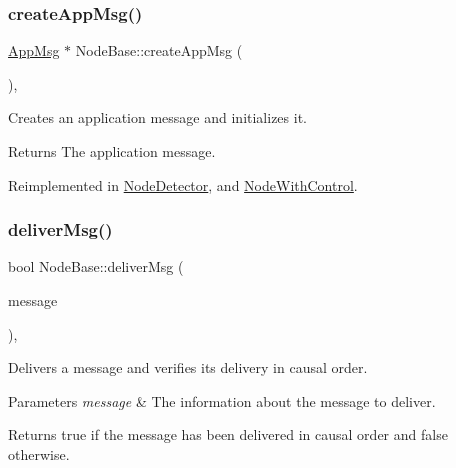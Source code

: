 \subsubsection{\texorpdfstring{create\+App\+Msg()}{createAppMsg()}}
{\footnotesize\ttfamily \hyperlink{class_app_msg}{App\+Msg} $\ast$ Node\+Base\+::create\+App\+Msg (\begin{DoxyParamCaption}{ }\end{DoxyParamCaption})\hspace{0.3cm}{\ttfamily [protected]}, {\ttfamily [virtual]}}



Creates an application message and initializes it. 

\begin{DoxyReturn}{Returns}
The application message. 
\end{DoxyReturn}


Reimplemented in \hyperlink{class_node_detector_a7100349647350ad5e3aeb1ed4669c723}{Node\+Detector}, and \hyperlink{class_node_with_control_a7772568c2836f5f204952ebe659e0049}{Node\+With\+Control}.

\mbox{\label{class_node_base_a49052382add1123da26db6bfb687d254}} 
\subsubsection{\texorpdfstring{deliver\+Msg()}{deliverMsg()}}
{\footnotesize\ttfamily bool Node\+Base\+::deliver\+Msg (\begin{DoxyParamCaption}\item[{const \hyperlink{structures_8h_a7e7bdc1d2fff8a9436f2f352b2711ed6}{message\+Info} \&}]{message }\end{DoxyParamCaption})\hspace{0.3cm}{\ttfamily [protected]}, {\ttfamily [virtual]}}



Delivers a message and verifies its delivery in causal order. 


\begin{DoxyParams}{Parameters}
{\em message} & The information about the message to deliver. \\
\hline
\end{DoxyParams}
\begin{DoxyReturn}{Returns}
true if the message has been delivered in causal order and false otherwise. 
\end{DoxyReturn}


